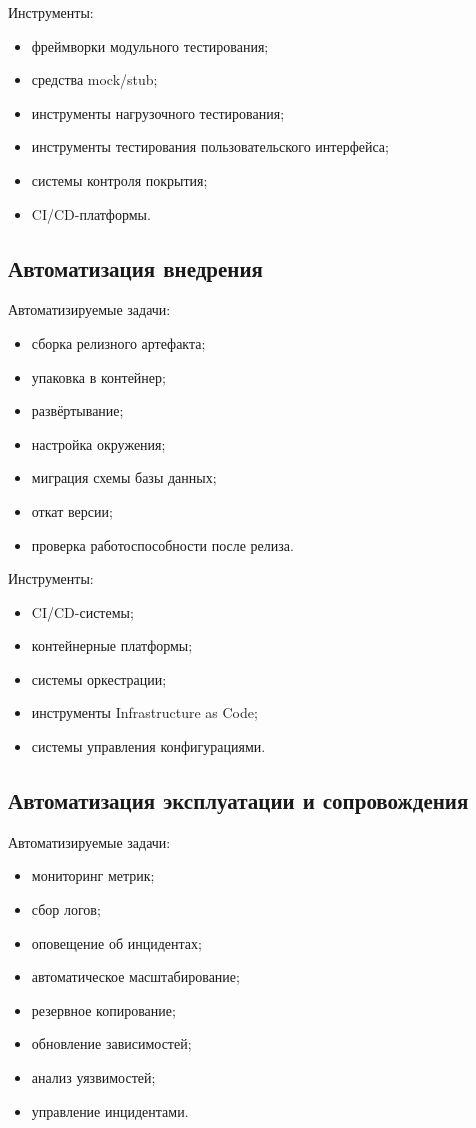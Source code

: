 \documentclass[12pt,a4paper]{article}
\begin{document}
Инструменты:
\begin{itemize}
    \item фреймворки модульного тестирования;
    \item средства mock/stub;
    \item инструменты нагрузочного тестирования;
    \item инструменты тестирования пользовательского интерфейса;
    \item системы контроля покрытия;
    \item CI/CD-платформы.
\end{itemize}

\subsection{Автоматизация внедрения}

Автоматизируемые задачи:
\begin{itemize}
    \item сборка релизного артефакта;
    \item упаковка в контейнер;
    \item развёртывание;
    \item настройка окружения;
    \item миграция схемы базы данных;
    \item откат версии;
    \item проверка работоспособности после релиза.
\end{itemize}

Инструменты:
\begin{itemize}
    \item CI/CD-системы;
    \item контейнерные платформы;
    \item системы оркестрации;
    \item инструменты Infrastructure as Code;
    \item системы управления конфигурациями.
\end{itemize}

\subsection{Автоматизация эксплуатации и сопровождения}

Автоматизируемые задачи:
\begin{itemize}
    \item мониторинг метрик;
    \item сбор логов;
    \item оповещение об инцидентах;
    \item автоматическое масштабирование;
    \item резервное копирование;
    \item обновление зависимостей;
    \item анализ уязвимостей;
    \item управление инцидентами.
\end{itemize}
\end{document}
